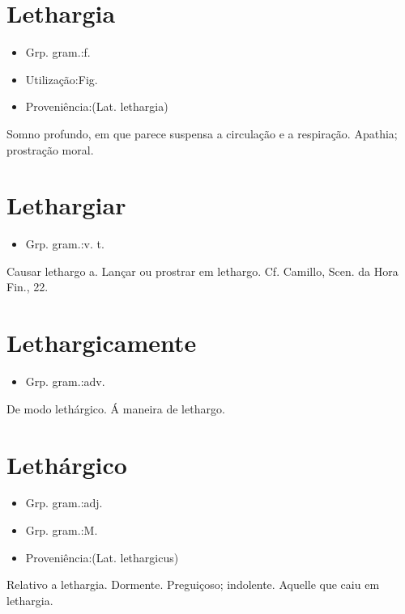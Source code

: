 \section{Lethargia}
\begin{itemize}
\item {Grp. gram.:f.}
\end{itemize}
\begin{itemize}
\item {Utilização:Fig.}
\end{itemize}
\begin{itemize}
\item {Proveniência:(Lat. \textunderscore lethargia\textunderscore )}
\end{itemize}
Somno profundo, em que parece suspensa a circulação e a respiração.
Apathia; prostração moral.
\section{Lethargiar}
\begin{itemize}
\item {Grp. gram.:v. t.}
\end{itemize}
Causar lethargo a.
Lançar ou prostrar em lethargo. Cf. Camillo, \textunderscore Scen. da Hora Fin.\textunderscore , 22.
\section{Lethargicamente}
\begin{itemize}
\item {Grp. gram.:adv.}
\end{itemize}
De modo lethárgico.
Á maneira de lethargo.
\section{Lethárgico}
\begin{itemize}
\item {Grp. gram.:adj.}
\end{itemize}
\begin{itemize}
\item {Grp. gram.:M.}
\end{itemize}
\begin{itemize}
\item {Proveniência:(Lat. \textunderscore lethargicus\textunderscore )}
\end{itemize}
Relativo a lethargia.
Dormente.
Preguiçoso; indolente.
Aquelle que caiu em lethargia.
